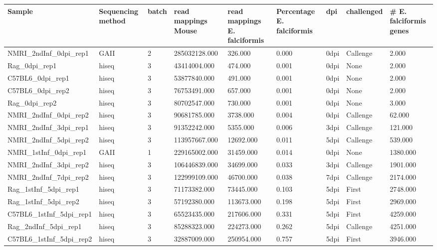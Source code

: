 \begin{table}[ht]
\centering
\begin{tabular}{lllllllll}
  \hline
Sample & Sequencing method & batch & read mappings Mouse & read mappings E. falciformis & Percentage E. falciformis & dpi & challenged & \# E. falciformis genes \\ 
  \hline
NMRI\_2ndInf\_0dpi\_rep1 & GAII & 2 & 285032128.000 & 326.000 & 0.000 & 0dpi & Callenge & 2.000 \\ 
  Rag\_0dpi\_rep1 & hiseq & 3 & 43414004.000 & 474.000 & 0.001 & 0dpi & None & 2.000 \\ 
  C57BL6\_0dpi\_rep1 & hiseq & 3 & 53877840.000 & 491.000 & 0.001 & 0dpi & None & 2.000 \\ 
  C57BL6\_0dpi\_rep2 & hiseq & 3 & 76753491.000 & 657.000 & 0.001 & 0dpi & None & 2.000 \\ 
  Rag\_0dpi\_rep2 & hiseq & 3 & 80702547.000 & 730.000 & 0.001 & 0dpi & None & 3.000 \\ 
  NMRI\_2ndInf\_0dpi\_rep2 & hiseq & 3 & 90681785.000 & 3738.000 & 0.004 & 0dpi & Callenge & 62.000 \\ 
  NMRI\_2ndInf\_3dpi\_rep1 & hiseq & 3 & 91352242.000 & 5355.000 & 0.006 & 3dpi & Callenge & 121.000 \\ 
  NMRI\_2ndInf\_5dpi\_rep2 & hiseq & 3 & 113957667.000 & 12692.000 & 0.011 & 5dpi & Callenge & 539.000 \\ 
  NMRI\_1stInf\_0dpi\_rep1 & GAII & 1 & 229165002.000 & 31459.000 & 0.014 & 0dpi & None & 1380.000 \\ 
  NMRI\_2ndInf\_3dpi\_rep2 & hiseq & 3 & 106446839.000 & 34699.000 & 0.033 & 3dpi & Callenge & 1901.000 \\ 
  NMRI\_2ndInf\_7dpi\_rep2 & hiseq & 3 & 122999109.000 & 46700.000 & 0.038 & 7dpi & Callenge & 2174.000 \\ 
  Rag\_1stInf\_5dpi\_rep1 & hiseq & 3 & 71173382.000 & 73445.000 & 0.103 & 5dpi & First & 2748.000 \\ 
  Rag\_1stInf\_5dpi\_rep2 & hiseq & 3 & 57192380.000 & 113673.000 & 0.198 & 5dpi & First & 2969.000 \\ 
  C57BL6\_1stInf\_5dpi\_rep1 & hiseq & 3 & 65523435.000 & 217606.000 & 0.331 & 5dpi & First & 4259.000 \\ 
  Rag\_2ndInf\_5dpi\_rep1 & hiseq & 3 & 85288323.000 & 224273.000 & 0.262 & 5dpi & Callenge & 4251.000 \\ 
  C57BL6\_1stInf\_5dpi\_rep2 & hiseq & 3 & 32887009.000 & 250954.000 & 0.757 & 5dpi & First & 3946.000 \\ 

\end{tabular}
\end{table}
